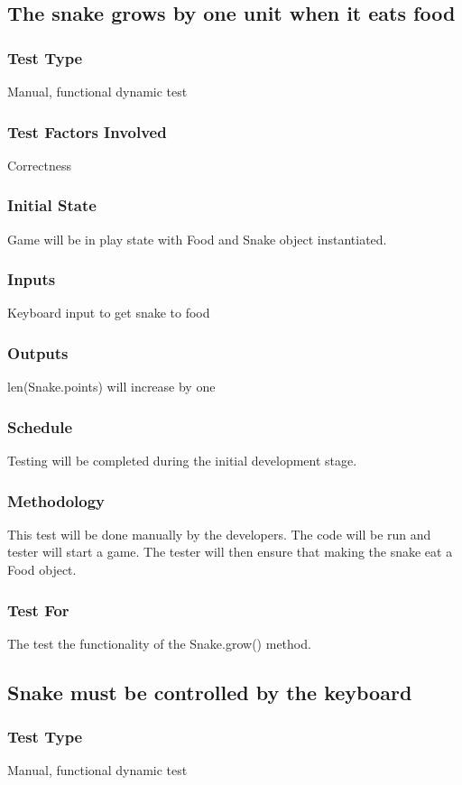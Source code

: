 \documentclass[12pt]{article}
\begin{document}
\noindent
\subsection{The snake grows by one unit when it eats food}
\subsubsection*{Test Type}
Manual, functional dynamic test
\subsubsection*{Test Factors Involved}
Correctness
\subsubsection*{Initial State}
Game will be in play state with Food and Snake object instantiated.
\subsubsection*{Inputs}
Keyboard input to get snake to food
\subsubsection*{Outputs}
len(Snake.points) will increase by one
\subsubsection*{Schedule}
Testing will be completed during the initial development stage.
\subsubsection*{Methodology}
This test will be done manually by the developers. The code will be run and tester will start a game. The tester will then ensure that making the snake eat a Food object.
\subsubsection*{Test For}
The test the functionality of the Snake.grow() method. \newline

\noindent
\subsection{Snake must be controlled by the keyboard}
\subsubsection*{Test Type}
Manual, functional dynamic test
\end{document}
